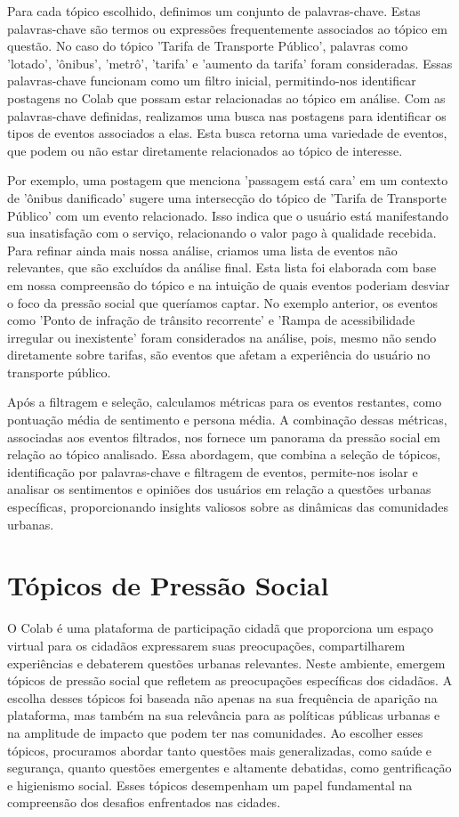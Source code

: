 Para cada tópico escolhido, definimos um conjunto de palavras-chave. Estas palavras-chave são termos ou expressões frequentemente associados ao tópico em questão. No caso do tópico 'Tarifa de Transporte Público', palavras como 'lotado', 'ônibus', 'metrô', 'tarifa' e 'aumento da tarifa' foram consideradas. Essas palavras-chave funcionam como um filtro inicial, permitindo-nos identificar postagens no Colab que possam estar relacionadas ao tópico em análise. Com as palavras-chave definidas, realizamos uma busca nas postagens para identificar os tipos de eventos associados a elas. Esta busca retorna uma variedade de eventos, que podem ou não estar diretamente relacionados ao tópico de interesse.

Por exemplo, uma postagem que menciona 'passagem está cara' em um contexto de 'ônibus danificado' sugere uma intersecção do tópico de 'Tarifa de Transporte Público' com um evento relacionado. Isso indica que o usuário está manifestando sua insatisfação com o serviço, relacionando o valor pago à qualidade recebida. Para refinar ainda mais nossa análise, criamos uma lista de eventos não relevantes, que são excluídos da análise final. Esta lista foi elaborada com base em nossa compreensão do tópico e na intuição de quais eventos poderiam desviar o foco da pressão social que queríamos captar. No exemplo anterior, os eventos como 'Ponto de infração de trânsito recorrente' e 'Rampa de acessibilidade irregular ou inexistente' foram considerados na análise, pois, mesmo não sendo diretamente sobre tarifas, são eventos que afetam a experiência do usuário no transporte público.

Após a filtragem e seleção, calculamos métricas para os eventos restantes, como pontuação média de sentimento e persona média. A combinação dessas métricas, associadas aos eventos filtrados, nos fornece um panorama da pressão social em relação ao tópico analisado. Essa abordagem, que combina a seleção de tópicos, identificação por palavras-chave e filtragem de eventos, permite-nos isolar e analisar os sentimentos e opiniões dos usuários em relação a questões urbanas específicas, proporcionando insights valiosos sobre as dinâmicas das comunidades urbanas.

\section{Tópicos de Pressão Social}

O Colab é uma plataforma de participação cidadã que proporciona um espaço virtual para os cidadãos expressarem suas preocupações, compartilharem experiências e debaterem questões urbanas relevantes. Neste ambiente, emergem tópicos de pressão social que refletem as preocupações específicas dos cidadãos. A escolha desses tópicos foi baseada não apenas na sua frequência de aparição na plataforma, mas também na sua relevância para as políticas públicas urbanas e na amplitude de impacto que podem ter nas comunidades. Ao escolher esses tópicos, procuramos abordar tanto questões mais generalizadas, como saúde e segurança, quanto questões emergentes e altamente debatidas, como gentrificação e higienismo social. Esses tópicos desempenham um papel fundamental na compreensão dos desafios enfrentados nas cidades.

